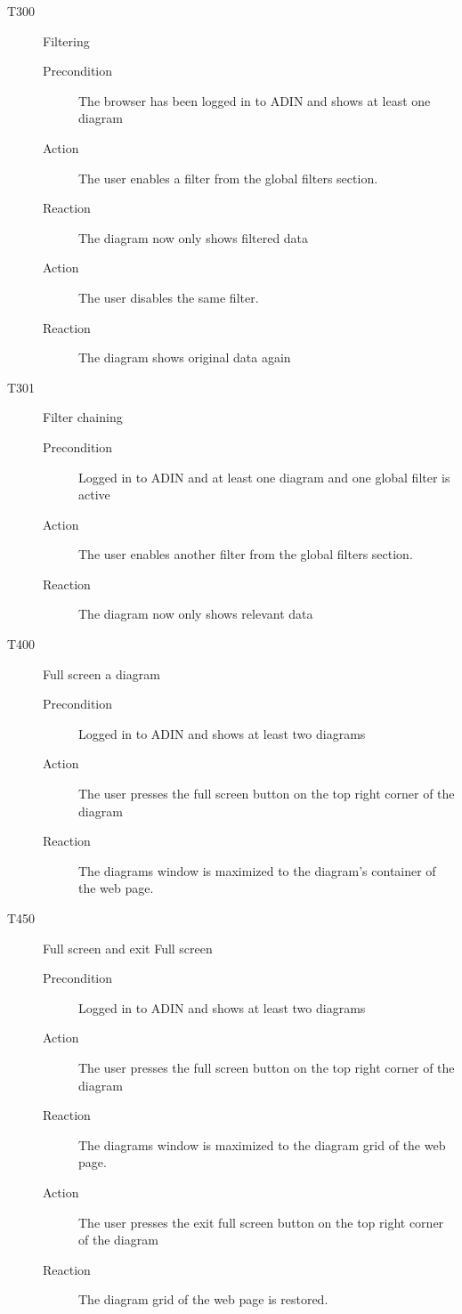 \documentclass[twoside, english, draft]{Pflichtenheft}
\begin{document}
\begin{description}
  \item[T300] Filtering
\begin{description}
    \item[Precondition]
	The browser has been logged in to ADIN and shows at least one diagram
    \item[Action]
    The user enables a filter from the global filters section.
    \item[Reaction]
	The diagram now only shows filtered data
	\item[Action]
    The user disables the same filter.
    \item[Reaction]
	The diagram shows original data again
\end{description}

  \item[T301] Filter chaining
\begin{description}
    \item[Precondition]
	Logged in to ADIN and at least one diagram and one global filter is active
    \item[Action]
    The user enables another filter from the global filters section.
    \item[Reaction]
	The diagram now only shows relevant data
\end{description}

  \item[T400] Full screen a diagram
\begin{description}
    \item[Precondition]
	Logged in to ADIN and shows at least two diagrams
    \item[Action]
    The user presses the full screen button on the top right corner of the diagram
    \item[Reaction]
	The diagrams window is maximized to the diagram's container of the web page.
\end{description}

  \item[T450] Full screen and exit Full screen
\begin{description}
    \item[Precondition]
	Logged in to ADIN and shows at least two diagrams
    \item[Action]
    The user presses the full screen button on the top right corner of the diagram
    \item[Reaction]
	The diagrams window is maximized to the diagram grid of the web page.
    \item[Action]
    The user presses the exit full screen button on the top right corner of the diagram
    \item[Reaction]
	The diagram grid of the web page is restored.
\end{description}


\end{description}
\end{document}
